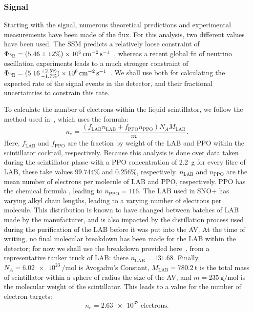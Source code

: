 \subsubsection{\beight{} Signal}
Starting with the \beight{} signal, numerous theoretical predictions and experimental measurements have been made of the \beight{} flux. For this analysis, two different values have been used. The SSM predicts a relatively loose constraint of $\Phi_{\beight{}} = (5.46\pm 12\%)\times 10^{6}\,\si{\per\cm\squared\per\second}$~\cite{}, %
whereas a recent global fit of neutrino oscillation experiments leads to a much stronger constraint of $\Phi_{\beight{}} = (5.16\,^{+2.5\%}_{-1.7\%})\times 10^{6}\,\si{\per\cm\squared\per\second}$~\cite{}. %
We shall use both for calculating the expected rate of the signal events in the detector, and their fractional uncertainties to constrain this rate.

To calculate the number of electrons within the liquid scintillator, we follow the method used in~\cite{inacioDataAnalysisWater2022}, %
which uses the formula:
\begin{equation}
    n_{e} = \frac{\left(f_{\mathrm{LAB}}n_{\mathrm{LAB}} +
                        f_{\mathrm{PPO}}n_{\mathrm{PPO}}\right)
                  N_{A}M_{\mathrm{LAB}}}
                 {m}.
\end{equation}
Here, $f_{\mathrm{LAB}}$ and $f_{\mathrm{PPO}}$ are the fraction by weight of the LAB and PPO within the scintillator cocktail, respectively. Because this analysis is done over data taken during the scintillator phase with a PPO concentration of \SI{2.2}{\g} for every litre of LAB, these take values 99.744\% and 0.256\%, respectively. $n_{\mathrm{LAB}}$ and $n_{\mathrm{PPO}}$ are the mean number of electrons per molecule of LAB and PPO, respectively. PPO has the chemical formula , leading to $n_{\mathrm{PPO}} = 116$. The LAB used in SNO+ has varying alkyl chain lengths, leading to a varying number of electrons per molecule. This distribution is known to have changed between batches of LAB made by the manufacturer, and is also impacted by the distillation process used during the purification of the LAB before it was put into the AV. At the time of writing, no final molecular breakdown has been made for the LAB within the detector; for now we shall use the breakdown provided here~\cite{}, %
from a representative tanker truck of LAB: there $n_{\mathrm{LAB}} = 131.68$. Finally, $N_{A} = \SI{6.02e23}{\per\mol}$ is Avogadro's Constant, $M_{\mathrm{LAB}} = \SI{780.2}{\tonne}$ is the total mass of scintillator within a sphere of radius the size of the AV, and $m = \SI{235}{\g\per\mol}$ is the molecular weight of the scintillator. This leads to a value for the number of electron targets:
\begin{equation*}
    n_{e} = \num{2.63e32}\; \mathrm{electrons}.
\end{equation*}

